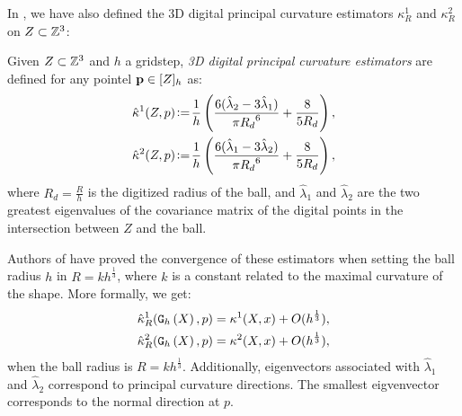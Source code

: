 \documentclass{llncs}
\begin{document}
In \cite{CVIU2014}, we have also defined the 3D digital principal curvature estimators $\kappa^1_{R}$ and $\kappa^2_{R}$
on $Z\subset{\mathbb{Z}}^3$:
\begin{Definition}
  Given $Z \subset {\mathbb{Z}}^3$ and
  $h$ a gridstep, {\em 3D digital principal curvature estimators} are defined for any pointel
  $\mathbf{p} \in \lbrack Z \rbrack_{h}$ as:
  \begin{align}
    \hat{\kappa}^{1}(Z,p) &\!\mathrel{\mathop:}=\! \frac{1}{h} \left( \frac{6(\hat{\lambda}_2 - 3\hat{\lambda}_1)}{\pi {{R_d}}^6} + \frac{8}{5{{R_d}}} \right),\label{eq:dig-curvature-estimator-k1}\\
    \hat{\kappa}^{2}(Z,p) &\!\mathrel{\mathop:}=\! \frac{1}{h} \left( \frac{6(\hat{\lambda}_1 - 3\hat{\lambda}_2)}{\pi {{R_d}}^6} + \frac{8}{5{{R_d}}} \right),
    \label{eq:dig-curvature-estimator-k2}
  \end{align}
  where $R_d = \frac{R}{h}$ is the digitized radius of the ball, and
  $\hat{\lambda}_1$ and $\hat{\lambda}_2$ are the two greatest eigenvalues of the covariance matrix of the digital points in the intersection between $Z$ and the ball.
\end{Definition}

Authors of \cite{CVIU2014} have proved the convergence of these
estimators when setting the ball radius $h$ in $R = kh^\frac{1}{3}$,
where $k$ is a constant related to the maximal curvature of the
shape. More formally, we get:
\begin{align}
  \hat{\kappa}^1_{R}(\mathtt{G}_{h}\left(X\right),p) &= \kappa^1(X,x) + O(h^{\frac{1}{3}}),\\
  \hat{\kappa}^2_{R}(\mathtt{G}_{h}\left(X\right),p) &= \kappa^2(X,x) + O(h^{\frac{1}{3}}),
\end{align}
when the ball radius is $R = kh^\frac{1}{3}$.
Additionally, eigenvectors associated with $\hat{\lambda}_1$ and
$\hat{\lambda}_2$ correspond to principal curvature directions. The
smallest eigvenvector corresponds to the normal direction at $p$.

\end{document}
